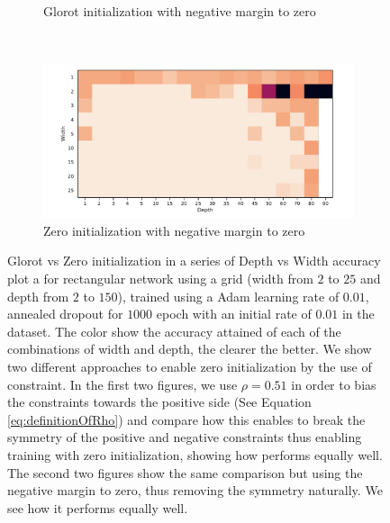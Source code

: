 \begin{figure}[h!]
\begin{subfigure}[b]{0.2\textwidth}
        \caption{Glorot initialization with negative margin to zero}
        \label{fig:moons_glorot_nm0}
    \end{subfigure}
    ~ %
    \centering
    \begin{subfigure}[b]{0.2\textwidth}
        \includegraphics[width=\textwidth]{img/moons_grid/acc-sep-up-0-0001-nm-0.pdf}
        \caption{Zero initialization with negative margin to zero}
        \label{fig:moons_zeros_nm0}
    \end{subfigure}
    
  \caption{Glorot vs Zero initialization in a series of Depth vs Width accuracy plot a for rectangular network using a grid (width from $2$ to $25$ and depth from $2$ to $150$),  trained using a Adam learning rate of $0.01$, annealed dropout for $1000$ epoch with an initial rate of $0.01$ in the \moons dataset. The color show the accuracy attained of each of the combinations of width and depth, the clearer the better. We show two different approaches to enable zero initialization by the use of \SepUnitPoint constraint. In the first two figures, we use $\rho = 0.51$ in order to bias the constraints towards the positive side (See Equation \ref{eq:definitionOfRho}) and compare how this enables to break the symmetry of the positive and negative constraints thus enabling training with zero initialization, showing how performs equally well. The second two figures show the same comparison but using the negative margin to zero, thus removing the symmetry naturally. We see how it performs equally well.
  }
  \label{fig:moons_grid_zero} 
\end{figure}
     
